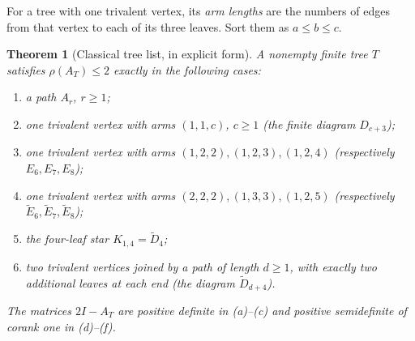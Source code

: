 \documentclass[11pt]{article}
\numberwithin{equation}{section}
\newtheorem{theorem}{Theorem}[section]
\theoremstyle{definition}
\begin{document}
For a tree with one trivalent vertex, its \emph{arm lengths} are the
numbers of edges from that vertex to each of its three leaves.  Sort them
as $a\le b\le c$.

\begin{theorem}[Classical tree list, in explicit form]
\label{ade:thm:ADElist}
A nonempty finite tree $T$ satisfies $\rho(A_T)\le2$ exactly in the
following cases:
\begin{enumerate}[label=(\alph*)]
 \item a path $A_r$, $r\ge1$;
 \item one trivalent vertex with arms $(1,1,c)$, $c\ge1$
       (the finite diagram $D_{c+3}$);
 \item one trivalent vertex with arms
       $(1,2,2),(1,2,3),(1,2,4)$
       (respectively $E_6,E_7,E_8$);
 \item one trivalent vertex with arms
       $(2,2,2),(1,3,3),(1,2,5)$
       (respectively $\widetilde E_6,\widetilde E_7,\widetilde E_8$);
 \item the four-leaf star $K_{1,4}=\widetilde D_4$;
 \item two trivalent vertices joined by a path of length $d\ge1$,
       with exactly two additional leaves at each end
       (the diagram $\widetilde D_{d+4}$).
\end{enumerate}
The matrices $2I-A_T$ are positive definite in (a)--(c) and positive
semidefinite of corank one in (d)--(f).
\end{theorem}
\end{document}
